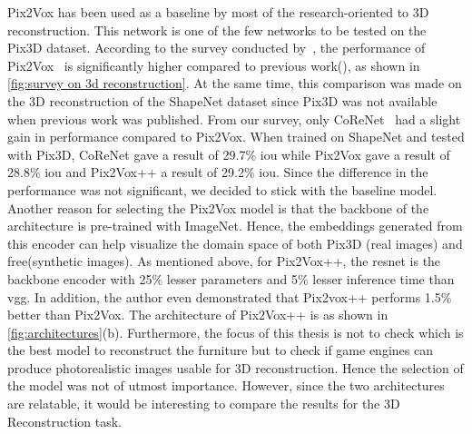 Pix2Vox has been used as a baseline by most of the research-oriented to 3D reconstruction.
This network is one of the few networks to be tested on the Pix3D dataset.
According to the survey conducted by~\cite{Han2021ImageBased3O}, the performance of Pix2Vox~\cite{Xie_2019}
is significantly higher compared to previous work(\cite{Tulsiani2017,tatarchenko2016multiview,Roth2018,Gwak2018,Johnston2017}), as shown in \autoref{fig:survey on 3d reconstruction}.
At the same time, this comparison was made on the 3D reconstruction of the ShapeNet dataset since Pix3D was not available when previous work was published.
From our survey, only CoReNet~\cite{popov2020corenet} had a slight gain in performance compared to Pix2Vox.
When trained on ShapeNet and tested with Pix3D, CoReNet gave a result of 29.7\% \gls{iou} while Pix2Vox gave a result of 28.8\% \gls{iou}  and Pix2Vox++ a result of 29.2\% \gls{iou}\@.
Since the difference in the performance was not significant, we decided to stick with the baseline model.
Another reason for selecting the Pix2Vox model is that the backbone of the architecture is pre-trained with ImageNet.
Hence, the embeddings generated from this encoder can help visualize the domain space of both Pix3D (real images)  and \gls{free}(synthetic images).
As mentioned above, for Pix2Vox++, the \gls{resnet} is the backbone encoder with 25\% lesser parameters and 5\% lesser inference time than \gls{vgg}\@.
In addition, the author even demonstrated that Pix2vox++ performs 1.5\% better than Pix2Vox.
The architecture of Pix2Vox++ is as shown in \autoref{fig:architectures}(b).
Furthermore, the focus of this thesis is not to check which is the best model to reconstruct the furniture but to check if game engines can produce photorealistic images usable for 3D reconstruction.
Hence the selection of the model was not of utmost importance.
However, since the two architectures are relatable, it would be interesting to compare the results for the 3D Reconstruction task.

%

